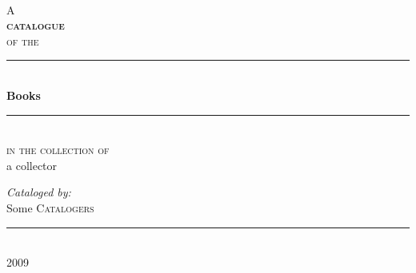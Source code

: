 % 
% 
\begin{titlepage}
 
\begin{center}
 
 
~\\[1cm]
{\small A}\\[0.5cm]

\textsc{\huge\bfseries catalogue}\\[0.5cm]
 
\textsc{\small of the}\\[0.5cm]
 
 
\rule{\linewidth}{0.5mm}\\[0.4cm]
{ \huge \bfseries Books}\\[0.4cm]

\rule{\linewidth}{0.5mm}\\[0.5cm]

\textsc{\small in the collection of}\\[0.5cm]

{\selectfont\LARGE a collector}\\[1.5cm]
 
\begin{flushleft} \large
\emph{Cataloged by:}\\
Some \textsc{Catalogers}\\
\end{flushleft}
 
\vfill
 
\rule{6cm}{0.25mm}\\[0.2cm]

{\large 2009}
 
\end{center}
 
\end{titlepage}

